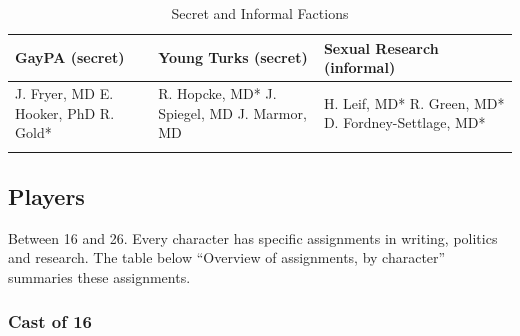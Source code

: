  \begin{longtable}[!t]{ | P{3cm} | P{3cm} | P{3.5cm} | }
\hline
GayPA (secret) & Young Turks (secret) & Sexual Research (informal) \\ \hline
J. Fryer, MD\newline
E. Hooker, PhD\newline
R. Gold*
&
R. Hopcke, MD*\newline
J. Spiegel, MD\newline
J. Marmor, MD
&
H. Leif, MD*\newline
R. Green, MD*\newline
D. Fordney-Settlage, MD* \\ \hline
\caption{Secret and Informal Factions}
\label{table: secretfactions}
\end{longtable} 

\subsection{Players}
\label{players}

Between 16 and 26. Every character has specific assignments in writing, politics and research. The table below ``Overview of assignments, by character'' summaries these assignments. 

\subsubsection{Cast of 16}
\label{castof16}

